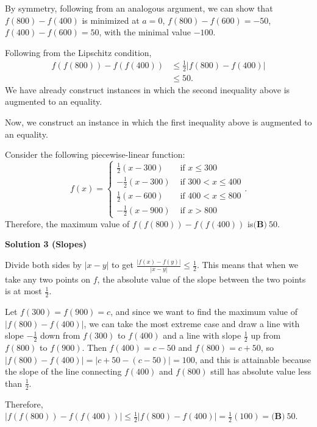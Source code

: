 \begin{enumerate}
 By symmetry, following from an analogous argument, we can show that $f(800) - f(400)$ is minimized at $a = 0$, $f(800)-f(600) = -50$, $f(400)-f(600)=50$, with the minimal value $-100$.

 Following from the Lipschitz condition,
 \begin{align*} f(f(800)) - f(f(400)) & \leq \frac{1}{2} \left| f(800) - f(400) \right| \\ & \leq 50 . \end{align*}
We have already construct instances in which the second inequality above is augmented to an equality.

 Now, we construct an instance in which the first inequality above is augmented to an equality.

 Consider the following piecewise-linear function:
 \[ f(x) = \left\{ \begin{array}{ll} \frac{1}{2} \left( x - 300 \right) & \mbox{ if } x \leq 300 \\ -\frac{1}{2} \left( x - 300 \right) & \mbox{ if } 300 < x \leq 400 \\ \frac{1}{2} \left( x - 600 \right) & \mbox{ if } 400 < x \leq 800 \\ -\frac{1}{2} \left( x - 900 \right) & \mbox{ if } x > 800 \end{array} \right.. \]Therefore, the maximum value of $f(f(800)) - f(f(400))$ is$\boxed{\textbf{(B)}\ 50}$.

 



\textbf{Solution 3 (Slopes)}

Divide both sides by $|x - y|$ to get $\frac{|f(x) - f(y)|}{|x - y|} \leq \frac{1}{2}$. This means that when we take any two points on $f$, the absolute value of the slope between the two points is at most $\frac{1}{2}$.

 Let $f(300) = f(900) = c$, and since we want to find the maximum value of $|f(800) - f(400)|$, we can take the most extreme case and draw a line with slope $-\frac{1}{2}$ down from $f(300)$ to $f(400)$ and a line with slope $\frac{1}{2}$ up from $f(800)$ to $f(900)$. Then $f(400) = c - 50$ and $f(800) = c + 50$, so $|f(800) - f(400)| = |c + 50 - (c - 50)| = 100$, and this is attainable because the slope of the line connecting $f(400)$ and $f(800)$ still has absolute value less than $\frac{1}{2}$.

 Therefore, $|f(f(800)) - f(f(400))| \leq \frac{1}{2}|f(800) - f(400)| = \frac{1}{2}(100) = \boxed{\textbf{(B)}\ 50}$.


\end{enumerate}
